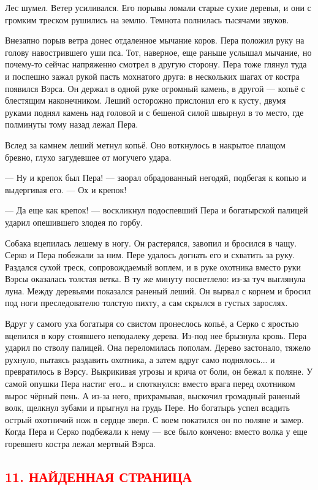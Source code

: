 \documentclass[oneside,final,14pt]{extreport}
\begin{document}
	Лес шумел. Ветер усиливался. Его порывы ломали старые сухие деревья, и они с громким треском рушились на землю. Темнота полнилась тысячами звуков.
	
	Внезапно порыв ветра донес отдаленное мычание коров. Пера положил руку на голову навострившего уши пса. Тот, наверное, еще раньше услышал мычание, но почему-то сейчас напряженно смотрел в другую сторону. Пера тоже глянул туда и поспешно зажал рукой пасть мохнатого друга: в нескольких шагах от костра появился Вэрса. Он держал в одной руке огромный камень, в другой — копьё с блестящим наконечником. Леший осторожно прислонил его к кусту, двумя руками поднял камень над головой и с бешеной силой швырнул в то место, где полминуты тому назад лежал Пера.
	
	Вслед за камнем леший метнул копьё. Оно воткнулось в накрытое плащом бревно, глухо загудевшее от могучего удара.
	
	— Ну и крепок был Пера! — заорал обрадованный негодяй, подбегая к копью и выдергивая его. — Ох и крепок!
	
	— Да еще как крепок! — воскликнул подоспевший Пера и богатырской палицей ударил опешившего злодея по горбу.
	
	Собака вцепилась лешему в ногу. Он растерялся, завопил и бросился в чащу. Серко и Пера побежали за ним. Пере удалось догнать его и схватить за руку. Раздался сухой треск, сопровождаемый воплем, и в руке охотника вместо руки Вэрсы оказалась толстая ветка. В ту же минуту посветлело: из-за туч выглянула луна. Между деревьями показался раненый леший. Он вырвал с корнем и бросил под ноги преследователю толстую пихту, а сам скрылся в густых зарослях.
	
	Вдруг у самого уха богатыря со свистом пронеслось копьё, а Серко с яростью вцепился в кору стоявшего неподалеку дерева. Из-под нее брызнула кровь. Пера ударил по стволу палицей. Она переломилась пополам. Дерево застонало, тяжело рухнуло, пытаясь раздавить охотника, а затем вдруг само поднялось... и превратилось в Вэрсу. Выкрикивая угрозы и крича от боли, он бежал к поляне. У самой опушки Пера настиг его… и споткнулся: вместо врага перед охотником вырос чёрный пень. А из-за него, прихрамывая, выскочил громадный раненый волк, щелкнул зубами и прыгнул на грудь Пере. Но богатырь успел всадить острый охотничий нож в сердце зверя. С воем покатился он по поляне и замер. Когда Пера и Серко подбежали к нему — все было кончено: вместо волка у еще горевшего костра лежал мертвый Вэрса.
	
			{%
		\centering
		\subsection*{\textcolor{red}{11. НАЙДЕННАЯ СТРАНИЦА}}
	}
\end{document}
